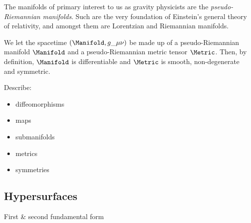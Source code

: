 









The manifolds of primary interest to us as gravity physicists are the \textit{pseudo-Riemannian manifolds}. Such are the very foundation of Einstein's general theory of relativity, and amongst them are Lorentzian and Riemannian manifolds.


We let the spacetime $(\Manifold, g\_{\mu\nu})$ be made up of a pseudo-Riemannian manifold $\Manifold$ and a pseudo-Riemannian metric tensor $\Metric$. Then, by definition, $\Manifold$ is differentiable and $\Metric$ is smooth, non-degenerate  and symmetric.




\begin{bullets}
    \item Describe:\begin{itemize}
        \item diffeomorphisms
        \item maps
        \item submanifolds
        \item metrics
        \item symmetries 
    \end{itemize}
\end{bullets}




\subsection{Hypersurfaces}
    \begin{bullets}
        \item First \& second fundamental form 
    \end{bullets}
